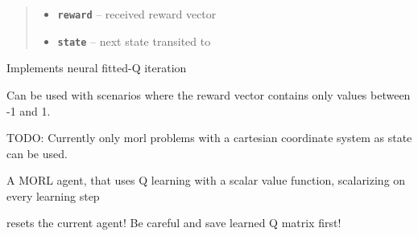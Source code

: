 \documentclass[letterpaper,10pt,english]{sphinxmanual}
\begin{document}
\begin{fulllineitems}
\begin{fulllineitems}
\begin{quote}
\begin{description}
\begin{itemize}
\item {} 
\textbf{\texttt{reward}} -- received reward vector

\item {} 
\textbf{\texttt{state}} -- next state transited to

\end{itemize}

\end{description}\end{quote}

\end{fulllineitems}


\end{fulllineitems}


\begin{fulllineitems}
\label{Agents:morl_agents.NFQAgent}
Implements neural fitted-Q iteration

Can be used with scenarios where the reward vector contains only
values between -1 and 1.

TODO: Currently only morl problems with a cartesian coordinate
system as state can be used.

\end{fulllineitems}


\begin{fulllineitems}
\label{Agents:morl_agents.PreScalarizedQMorlAgent}
A MORL agent, that uses Q learning with a scalar
value function, scalarizing on every learning step

\begin{fulllineitems}
\label{Agents:morl_agents.PreScalarizedQMorlAgent.reset}
resets the current agent! Be careful and save learned Q matrix first!

\end{fulllineitems}


\end{fulllineitems}
\end{document}
